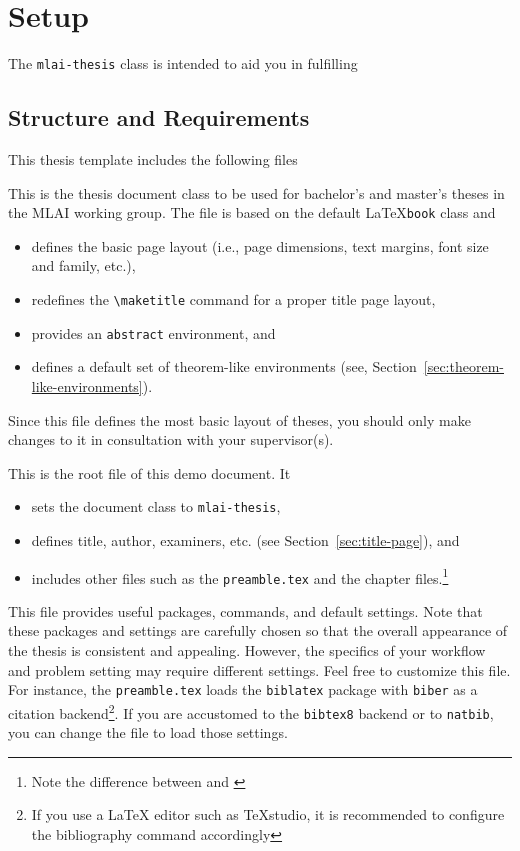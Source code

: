 \chapter{Setup}

The \texttt{mlai-thesis} class is intended to aid you in fulfilling 

\section{Structure and Requirements} 

This thesis template includes the following files 

\begin{description}[font=\normalfont\ttfamily]
	\item[mlai-thesis.cls] This is the thesis document class to be used for 
	bachelor's and master's theses in the MLAI working group. The file is based 
	on the default \LaTeX \texttt{book} class and  
	\begin{itemize}
		\item defines the basic page layout (i.e., page dimensions, text 
		margins, font size and family, etc.), 
		\item redefines the \verb|\maketitle| command for a 
		proper title page layout, 
		\item provides an \texttt{abstract} environment, and 
		\item defines a default set of theorem-like environments (see, Section~\ref{sec:theorem-like-environments}). 
	\end{itemize}
	Since this file defines the most basic layout of theses, you should only make changes to it in consultation with your supervisor(s). 
	\item[thesis.tex] This is the root file of this demo document. It 
	\begin{itemize}
		\item sets the document class to \texttt{mlai-thesis},
		\item defines title, author, examiners, etc. (see Section~\ref{sec:title-page}), and 
		\item includes other files such as the \texttt{preamble.tex} and the chapter files.\VerbatimFootnotes\footnote{ Note the difference between \verb|| and \verb||}
	\end{itemize}
	\item[preamble.tex] This file provides useful packages, commands, and default settings. Note that these packages and settings are carefully chosen so that the overall appearance of the thesis is consistent and appealing. However, the specifics of your workflow and problem setting may require different settings. Feel free to customize this file. For instance, the \texttt{preamble.tex} loads the \texttt{biblatex} package with \texttt{biber} as a citation backend\footnote{If you use a \LaTeX{} editor such as TeXstudio, it is recommended to configure the bibliography command accordingly}. If you are accustomed to the \texttt{bibtex8} backend or to \texttt{natbib}, you can change the file to load those settings. 

\end{description}
